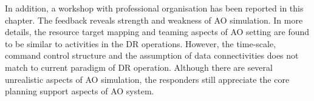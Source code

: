


In addition, a workshop with professional organisation has been reported in this chapter. The feedback reveals strength and weakness of \ac{AO} simulation. In more details, the resource target mapping and teaming aspects of \ac{AO} setting are found to be similar to activities in the DR operations. However, the time-scale, command control structure and the assumption of data connectivities does not match to current paradigm of DR operation. Although there are several unrealistic aspects of \ac{AO} simulation, the responders still appreciate the core planning support aspects of \ac{AO} system.\\

